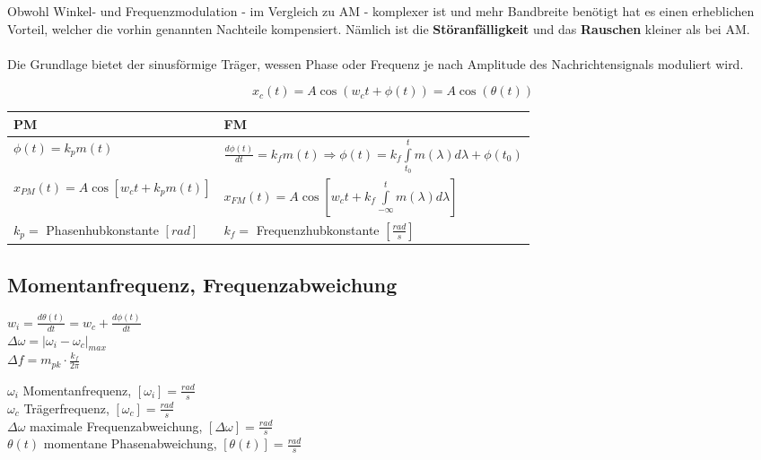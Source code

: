 Obwohl Winkel- und Frequenzmodulation - im Vergleich zu AM - komplexer ist und mehr Bandbreite
benötigt hat es einen erheblichen Vorteil, welcher die vorhin genannten Nachteile kompensiert.
Nämlich ist die \textbf{Störanfälligkeit} und das \textbf{Rauschen} kleiner als bei AM. \\
\\
Die Grundlage bietet der sinusförmige Träger, wessen Phase oder Frequenz je nach Amplitude des 
Nachrichtensignals moduliert wird.

$$\boxed{ x_c(t) = A \cos(w_c t + \phi(t)) = A \cos(\theta(t)) }$$

\begin{center}
\renewcommand{\arraystretch}{2}
\begin{tabular}{|p{8cm}|p{8cm}|}
	\hline
	\textbf{PM} &	\textbf{FM}\\
	\hline
	$\phi(t) = k_p m(t)$ &
	$ \frac{d \phi(t)}{dt} = k_f m(t) \Rightarrow \phi(t) = k_f \int\limits_{t_0}^{t} m(\lambda)
	d\lambda + \phi(t_0)$\\
	$x_{PM}(t) = A \cos[w_c t + k_p m(t)]$ &
	$x_{FM}(t) = A \cos[w_c t + k_f \int\limits_{- \infty}^{t} m(\lambda)
	d\lambda]$\\
	\hline
	$k_p=$ Phasenhubkonstante $[rad]$ & $k_f=$ Frequenzhubkonstante
	$[\frac{rad}{s}]$\\
	\hline
\end{tabular} 
\renewcommand{\arraystretch}{1}
\end{center}


\subsection{Momentanfrequenz, Frequenzabweichung}
\begin{multicols}{2}
	\begin{center}
		$ w_i = \frac{d \theta(t)}{dt} = w_c + \frac{d \phi(t)}{dt} $\\
		$ \Delta \omega = \left| \omega_i - \omega_c \right|_{max} $\\
		$ \Delta f =  m_{pk} \cdot \frac{k_f}{2\pi}$\\
	\end{center}
\columnbreak

	$\omega_i$ Momentanfrequenz, $[\omega_i] = \frac{rad}{s}$ \\
	$\omega_c$ Trägerfrequenz, $[\omega_c] = \frac{rad}{s}$ \\
	$\Delta \omega$ maximale Frequenzabweichung, $[\Delta \omega] = \frac{rad}{s}$ \\
	$\theta(t)$ momentane Phasenabweichung, $[\theta(t)] = \frac{rad}{s}$
	
\end{multicols}


